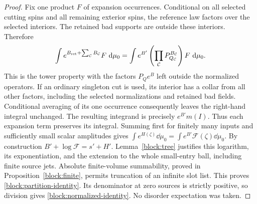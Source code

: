 \begin{proof}
Fix one product $F$ of expansion occurrences.  Conditional on all
selected cutting spins and all remaining exterior spins, the reference
law factors over the selected interiors.  The retained bad supports
are outside these interiors.  Therefore
\begin{equation}
 \int e^{B_{\rm ret}+\sum_{\mathcal C}B_{\mathcal C}}F\,\,\mathrm d\mu_0
 =\int e^{B'}\left(
       \prod_{\mathcal C}P_{Q_{\mathcal C}}^{B_{\mathcal C}}
                         \right)F\,\,\mathrm d\mu_0.
 \label{block:tilted-identity}
\end{equation}
This is the tower property with the factors $P_Qe^B$ left outside the
normalized operators.  If an ordinary singleton cut is used, its
interior has a collar from all other factors, including the selected
normalizations and retained bad fields.  Conditional averaging of its
one occurrence consequently leaves the right-hand integral unchanged.
The resulting integrand is precisely $e^{B'}m(I)$.  Thus each expansion
term preserves its integral.  Summing first for finitely many inputs
and sufficiently small scalar amplitudes gives
$\int e^{H(\zeta)}\dd\mu_0=\int e^{B'}\mathcal F(\zeta)\dd\mu_0$.
By construction $B'+\log\mathcal F=s'+H'$.  Lemma~\ref{block:tree}
justifies this logarithm, its exponentiation, and the extension to the
whole small-entry ball, including finite source jets.  Absolute
finite-volume summability, proved in Proposition~\ref{block:finite},
permits truncation of an infinite slot list.  This proves
\eqref{block:partition-identity}.  Its denominator at zero sources is
strictly positive, so division gives
\eqref{block:normalized-identity}.  No disorder expectation was taken.
\end{proof}

